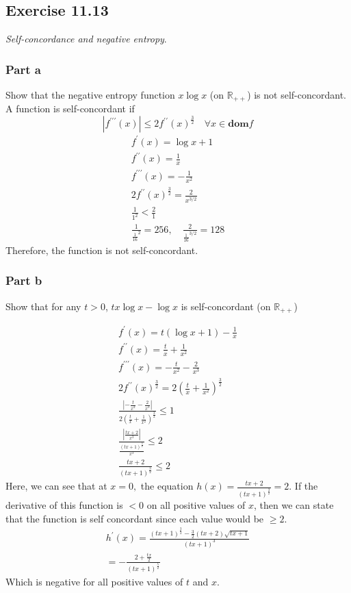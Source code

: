 \subsection{Exercise 11.13} 
\textit{Self-concordance and negative entropy}.
\subsubsection{Part a}
Show that the negative entropy function $x \log x$ (on $\mathbb{R}_{++}$) is not self-concordant. \\
A function is self-concordant if 
\begin{equation}
    |f^{\prime \prime \prime}(x) | \leq 2 f^{\prime \prime} (x)^{\frac{3}{2}} \quad \forall x \in \textbf{dom} f
\end{equation}
\begin{gather}
    f^{\prime}(x) = \log x + 1 \\
    f^{\prime \prime}(x) = \frac{1}{x} \\
    f^{\prime \prime \prime}(x) = - \frac{1}{x^2} \\ 
    2 f^{\prime \prime} (x)^{\frac{3}{2}} = \frac{2}{x^{3/2}} \\
    \frac{1}{1^2} < \frac{2}{1} \\ 
    \frac{1}{\frac{1}{16}^2} = 256, \quad \frac{2}{\frac{1}{16}^{3/2}} = 128
\end{gather} 
Therefore, the function is not self-concordant.

\subsubsection{Part b}
Show that for any $t > 0$, $tx \log x - \log x $ is self-concordant (on $\mathbb{R}_{++}$)

\begin{gather}
    f^{\prime}(x) = t(\log x + 1) - \frac{1}{x} \\
    f^{\prime \prime}(x) = \frac{t}{x} + \frac{1}{x^2} \\
    f^{\prime \prime \prime}(x) = -\frac{t}{x^2} - \frac{2}{x^3} \\ 
    2 f^{\prime \prime} (x)^{\frac{3}{2}} = 2(\frac{t}{x} + \frac{1}{x^2})^\frac{3}{2} \\
    \frac{|-\frac{t}{x^2} - \frac{2}{x^3}|}{2(\frac{t}{x} + \frac{1}{x^2})^\frac{3}{2}} \leq 1 \\ 
    \frac{|\frac{tx+2}{x^3}|}{\frac{(tx+1)^\frac{3}{2}}{x^3}} \leq 2 \\
    \frac{tx+2}{(tx+1)^\frac{3}{2}} \leq 2
\end{gather} 
Here, we can see that at $ x= 0,$ the equation $h(x) = \frac{tx+2}{(tx+1)^\frac{3}{2}} = 2$. If the derivative of this function is $<0$ on all positive values of $x$, then we can state that the function is self concordant since each value would be $\geq 2$.
\begin{gather}
    h^\prime (x) = \frac{(tx+1)^\frac{3}{2} - \frac{3}{2}(tx+2) \sqrt{tx+1}}{(tx+1)^3} \\
    = - \frac{2+\frac{tx}{2}}{(tx+1)^\frac{5}{2}}
\end{gather}
Which is negative for all positive values of $t$ and $x$.